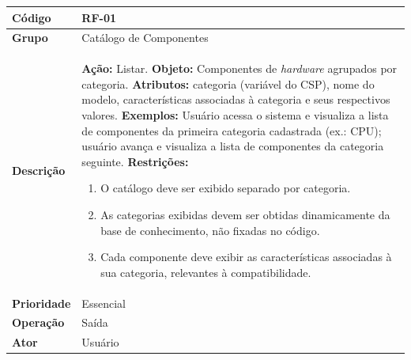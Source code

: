 \FloatBarrier
\begin{quadro}[htb]
  \caption{RF-01 -- Listar componentes por categoria}
  \label{quad:rf01}
  \begin{tabular}{|p{3.2cm}|p{11.8cm}|}
    \hline
    \textbf{Código}     & RF-01                                                                                     \\ \hline
    \textbf{Grupo}      & Catálogo de Componentes                                                                   \\ \hline
    \textbf{Descrição}  &
    \textbf{Ação:} Listar.
    \textbf{Objeto:} Componentes de \textit{hardware} agrupados por categoria.
    \textbf{Atributos:} categoria (variável do CSP), nome do modelo, características associadas à categoria e seus respectivos valores.
    \textbf{Exemplos:} Usuário acessa o sistema e visualiza a lista de componentes da primeira categoria cadastrada (ex.: CPU); usuário avança e visualiza a lista de componentes da categoria seguinte.
    \textbf{Restrições:}
    \begin{enumerate}[nosep,leftmargin=1.2em,topsep=2pt,partopsep=0pt,parsep=0pt,itemsep=1pt]
      \item O catálogo deve ser exibido separado por categoria.
      \item As categorias exibidas devem ser obtidas dinamicamente da base de conhecimento, não fixadas no código.
      \item Cada componente deve exibir as características associadas à sua categoria, relevantes à compatibilidade.
    \end{enumerate} \\ \hline
    \textbf{Prioridade} & Essencial                                                                                 \\ \hline
    \textbf{Operação}   & Saída                                                                                     \\ \hline
    \textbf{Ator}       & Usuário                                                                                   \\ \hline
  \end{tabular}
\end{quadro}

